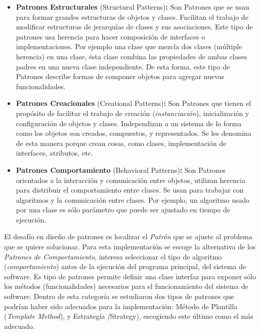 
\begin{itemize}
\item \textbf{Patrones Estructurales} (Structural Patterns)\textbf{:} Son Patrones que se usan para formar grandes estructuras de objetos y clases. Facilitan el trabajo de modificar estructuras de jerarquías de clases y sus asociaciones. Este tipo de patrones usa herencia para hacer composición de interfaces o implementaciones. Por ejemplo una clase que mezcla dos clases (múltiple herencia) en una clase, ésta clase combina las propiedades de ambas clases padres en una nueva clase independiente. De esta forma, este tipo de Patrones describe formas de componer objetos para agregar nuevas funcionalidades.
 \item \textbf{Patrones Creacionales} (Creational Patterns)\textbf{:} Son Patrones que tienen el propósito de facilitar el trabajo de creación (\textit{instanciación}), inicialización y configuración de objetos y clases. Independizan a un sistema de lo forma como los objetos son creados, compuestos, y representados. Se les denomina de esta manera porque crean cosas, como clases, implementación de interfaces, atributos, etc.
 \item \textbf{Patrones Comportamiento} (Behavioral Patterns)\textbf{:} Son Patrones orientados a la interacción y comunicación entre objetos, utilizan herencia para distribuir el comportamiento entre clases. Se usan para trabajar con algoritmos y la comunicación entre clases. Por ejemplo, un algoritmo usado por una clase es sólo parámetro que puede ser ajustado en tiempo de ejecución.
\end{itemize}

El desafío en diseño de patrones es localizar el \textit{Patrón} que se ajuste al problema que se quiere solucionar. Para esta implementación se escoge la alternativa de los \textit{Patrones de Comportamiento}, interesa seleccionar el tipo de algoritmo (\textit{comportamiento}) antes de la ejecución del programa principal, del sistema de software.  Es tipo de patrones permite definir una clase interfaz para exponer sólo los métodos (funcionalidades) necesarios para el funcionamiento del sistema de software. Dentro de esta categoría se estudiaron dos tipos de patrones que podrían haber sido adecuados para la implementación: Método de Plantilla (\textit{Template Method}), y Estrategía \textit(Strategy), escogiendo este último como el más adecuado.

